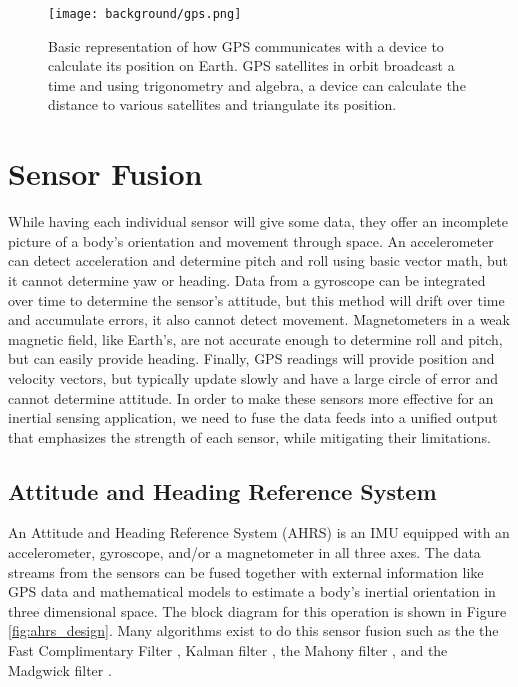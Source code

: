\begin{figure}[h!]
    \caption[GPS diagram]{Basic representation of how GPS communicates with a device to calculate its position on Earth.
    GPS satellites in orbit broadcast a time and using trigonometry and algebra, a device can calculate the distance to various satellites and triangulate its position.}
    \centering
    \texttt{[image: background/gps.png]}
\end{figure}

\section{Sensor Fusion} 
While having each individual sensor will give some data, they offer an incomplete picture of a body's orientation and movement through space.
An accelerometer can detect acceleration and determine pitch and roll using basic vector math, but it cannot determine yaw or heading.
Data from a gyroscope can be integrated over time to determine the sensor's attitude, but this method will drift over time and accumulate errors, it also cannot detect movement.
Magnetometers in a weak magnetic field, like Earth's, are not accurate enough to determine roll and pitch, but can easily provide heading.
Finally, GPS readings will provide position and velocity vectors, but typically update slowly and have a large circle of error and cannot determine attitude.
In order to make these sensors more effective for an inertial sensing application, we need to fuse the data feeds into a unified output that emphasizes the strength of each sensor, while mitigating their limitations.

\subsection{Attitude and Heading Reference System} \label{ssec:ahrs}
An Attitude and Heading Reference System (AHRS) is an IMU equipped with an accelerometer, gyroscope, and/or a magnetometer in all three axes.
The data streams from the sensors can be fused together with external information like GPS data and mathematical models to estimate a body's inertial orientation in three dimensional space.
The block diagram for this operation is shown in Figure \ref{fig:ahrs_design}.
Many algorithms exist to do this sensor fusion such as the the Fast Complimentary Filter \cite{FCF:2016}, Kalman filter \cite{Kalman:1960}, the Mahony filter \cite{Mahony:2008}, and the Madgwick filter \cite{Madgwick:dissertation}.

